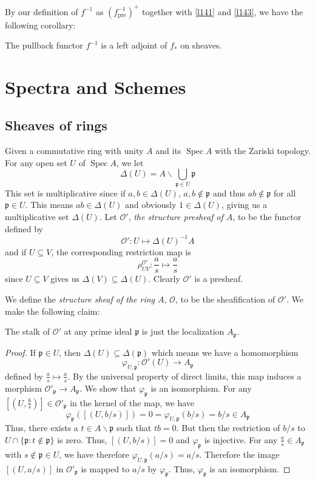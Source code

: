 \documentclass[12pt,letter]{article}
\newcommand{\D}[0]{\Delta}
\newcommand{\Spec}[0]{\operatorname{Spec}}
\begin{document}
	By our definition of $f^{-1}$ as $(f^{-1}_{\mathrm{pre}})^+$ together with \autoref{l141} and \autoref{l143}, we have the following corollary:
	\begin{corollary}\label{c141}
		The pullback functor $f^{-1}$ is a left adjoint of $f_*$ on sheaves.
	\end{corollary}
	\section{Spectra and Schemes}\label{sec-scheme}
	\subsection{Sheaves of rings}\label{ssec-sheaf-of-ring}
	Given a commutative ring with unity $A$ and its $\Spec A$ with the Zariski topology. For any open set $U$ of $\Spec A$, we let
	\[\D (U)=A\backslash\bigcup_{\mathfrak p\in U}\mathfrak p\]
	This set is multiplicative since if $a, b\in\D(U)$, $a, b\notin \mathfrak p$ and thus $ab\notin \mathfrak p$ for all $\mathfrak p\in U$. This means $ab\in\D (U)$ and obviously $1\in \D(U)$, giving us a multiplicative set $\D(U)$. Let $\mathscr O'$, \textit{the structure presheaf of $A$}, to be the functor defined by
	\[\mathscr O':U\mapsto \D(U)^{-1}A\]
	and if $U\subseteq V$, the corresponding restriction map is
	\[\rho_{UV}^{\mathscr O'}:\frac{a}{s}\mapsto \frac{a}{s}\]
	since $U\subseteq V$ gives us $\D(V)\subseteq \D(U)$. Clearly $\mathscr O'$ is a presheaf.
	
	We define the \textit{structure sheaf of the ring $A$}, $\mathscr O$, to be the sheafification of $\mathscr O'$. We make the following claim:
	\begin{lemma}\label{l211}
	The stalk of $\mathscr O'$ at any prime ideal $\mathfrak p$ is just the localization $A_{\mathfrak p}$.
	\end{lemma}
	\begin{proof}
	If $\mathfrak p\in U$, then $\D(U)\subseteq \D(\mathfrak p)$ which means we have a homomorphism
	\[\varphi_{U,\mathfrak p}:\mathscr O'(U)\to A_{\mathfrak p}\]
	defined by $\frac{a}{s}\mapsto \frac{a}{s}$. By the universal property of direct limits, this map induces a morphism $\mathscr O'_{\mathfrak p}\to A_{\mathfrak p}$. We show that $\varphi_{\mathfrak p}$ is an isomorphism. For any $[(U, \frac{b}{s})]\in \mathscr O'_{\mathfrak p}$ in the kernel of the map, we have
	\[\varphi_{\mathfrak p}([(U, b/s)])=0=\varphi_{U,\mathfrak p}(b/s)=b/s\in A_{\mathfrak p}\]
	Thus, there exists a $t\in A\backslash \mathfrak p$ such that $tb=0$. But then the restriction of $b/s$ to $U\cap \{\mathfrak p:t\notin \mathfrak p\}$ is zero. Thus, $[(U, b/s)]=0$ and $\varphi_{\mathfrak p}$ is injective. For any $\frac{a}{s}\in A_{\mathfrak p}$ with $s\notin \mathfrak p\in U$, we have therefore $\varphi_{U, \mathfrak p}(a/ s)=a/s$. Therefore the image $[(U, a/s)]$ in $\mathscr O'_{\mathfrak p}$ is mapped to $a/s$ by $\varphi_{\mathfrak p}$. Thus, $\varphi_{\mathfrak p}$ is an isomorphism.
	\end{proof}
	
\end{document}

